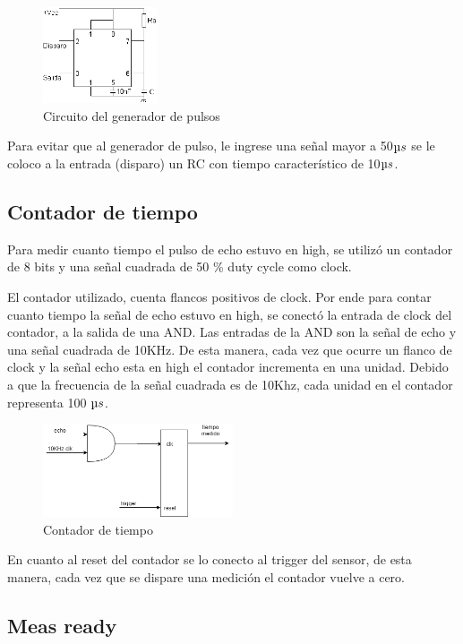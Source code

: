 \documentclass[../../e3_tp2_main.tex]{subfiles}
\begin{document}
\begin{figure}[H]	
	\centering
	\includegraphics[width=0.3\textwidth]{imagenes/555C.png}
	\caption{Circuito del generador de pulsos}\label{fig:555c}
\end{figure}
Para evitar que al generador de pulso, le ingrese una señal mayor a 50$\micro s$ se le coloco a la entrada (disparo) un RC con tiempo característico de 10$\micro s$. 

\subsection{Contador de tiempo}
Para medir cuanto tiempo el pulso de echo estuvo en high, se utilizó un contador de 8 bits y una señal cuadrada de 50 \% duty cycle como clock.
\par El contador utilizado, cuenta flancos positivos de clock. Por ende para contar cuanto tiempo la señal de echo estuvo en high, se conectó la entrada de clock del contador, a la salida de una AND. Las entradas de la AND son la señal de echo y una señal cuadrada de 10KHz. De esta manera, cada vez que ocurre un flanco de clock y la señal echo esta en high el contador incrementa en una unidad. Debido a que la frecuencia de la señal cuadrada es de 10Khz, cada unidad en el contador representa 100 $\micro s$.
\begin{figure}[H]	
	\centering
	\includegraphics[width=0.5\textwidth]{imagenes/contador.png}
	\caption{Contador de tiempo}
\end{figure}
\par En cuanto al reset del contador se lo conecto al trigger del sensor, de esta manera, cada vez que se dispare una medición el contador vuelve a cero.
\subsection{Meas ready}
\end{document}

